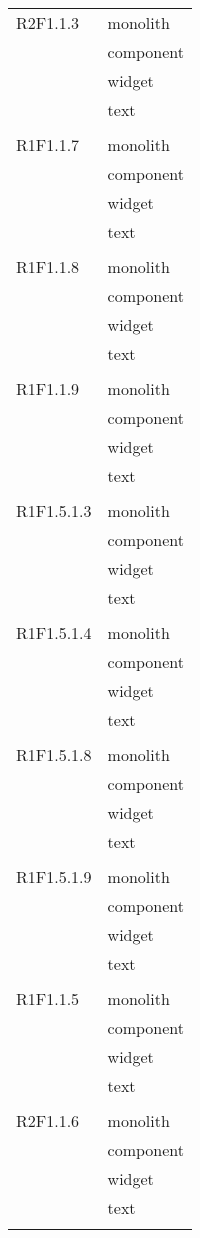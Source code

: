 \begin{center}
\begin{longtable}{|p{7cm}|p{7cm}|}
		R2F1.1.3 & monolith \\ & component \\ & widget \\ & text \\ & \\ \hline
		R1F1.1.7 & monolith \\ & component \\ & widget \\ & text \\ & \\ \hline
		R1F1.1.8 & monolith \\ & component \\ & widget \\ & text \\ & \\ \hline
		R1F1.1.9 & monolith \\ & component \\ & widget \\ & text \\ & \\ \hline
		R1F1.5.1.3 & monolith \\ & component \\ & widget \\ & text \\ & \\ \hline
		R1F1.5.1.4 & monolith \\ & component \\ & widget \\ & text \\ & \\ \hline
		R1F1.5.1.8 & monolith \\ & component \\ & widget \\ & text \\ & \\ \hline
		R1F1.5.1.9 & monolith \\ & component \\ & widget \\ & text \\ & \\ \hline
		R1F1.1.5 & monolith \\ & component \\ & widget \\ & text \\ & \\ \hline
		R2F1.1.6 & monolith \\ & component \\ & widget \\ & text \\ & \\ \hline

\end{longtable}
\end{center}
